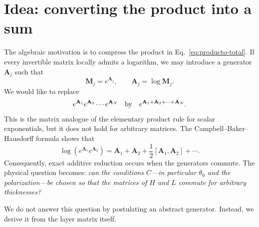 \documentclass[10pt,a4paper]{article}
\newcommand{\M}{\mathbf{M}}
\newcommand{\comm}[2]{\left[#1,#2\right]}
\begin{document}
\section{Idea: converting the product into a sum}

The algebraic motivation is to compress the product in Eq.~\eqref{eq:producto-total}. If every invertible matrix locally admits a logarithm, we may introduce a generator $\mathbf{A}_j$ such that
\begin{equation}
\M_j=e^{\mathbf{A}_j},
\qquad
\mathbf{A}_j=\log\M_j.
\label{eq:log-general}
\end{equation}
We would like to replace
\begin{equation}
e^{\mathbf{A}_1}e^{\mathbf{A}_2}\cdots e^{\mathbf{A}_N}
\quad\hbox{by}\quad
e^{\mathbf{A}_1+\mathbf{A}_2+\cdots+\mathbf{A}_N}.
\label{eq:deseo-aditivo}
\end{equation}
This is the matrix analogue of the elementary product rule for scalar exponentials, but it does not hold for arbitrary matrices. The Campbell--Baker--Hausdorff formula shows that
\begin{equation}
\log\!\left(e^{\mathbf{A}_1}e^{\mathbf{A}_2}\right)
=\mathbf{A}_1+\mathbf{A}_2+\frac{1}{2}\comm{\mathbf{A}_1}{\mathbf{A}_2}+\cdots.
\label{eq:bch-motivacion}
\end{equation}
Consequently, exact additive reduction occurs when the generators commute. The physical question becomes: \emph{can the conditions $C$---in particular $\theta_0$ and the polarization---be chosen so that the matrices of $H$ and $L$ commute for arbitrary thicknesses?}

We do not answer this question by postulating an abstract generator. Instead, we derive it from the layer matrix itself.
\end{document}
